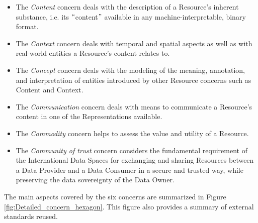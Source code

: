 \begin{itemize}
	\item The \textit{Content} concern deals with the description of a Resource’s inherent substance, i.e. its $``$content$"$  available in any machine-interpretable, binary format. 

	\item The \textit{Context} concern deals with temporal and spatial aspects as well as with real-world entities a Resource’s content relates to. 

	\item The \textit{Concept} concern deals with the modeling of the meaning, annotation, and interpretation of entities introduced by other Resource concerns such as Content and Context. 

	\item The \textit{Communication} concern deals with means to communicate a Resource’s content in one of the Representations available. 

	\item The \textit{Commodity }concern helps to assess the value and utility of a Resource. 

	\item The \textit{Community of trust} concern considers the fundamental requirement of the International Data Spaces for exchanging and sharing Resources between a Data Provider and a Data Consumer in a secure and trusted way, while preserving the data sovereignty of the Data Owner.

\end{itemize}

The main aspects covered by the six concerns are summarized in Figure \ref{fig:Detailed_concern_hexagon}.
This figure also provides a summary of external standards reused.



